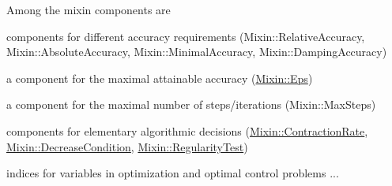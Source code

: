 Among the mixin components are
\begin{DoxyItemize}
\item components for different accuracy requirements (Mixin\+::\+Relative\+Accuracy, Mixin\+::\+Absolute\+Accuracy, Mixin\+::\+Minimal\+Accuracy, Mixin\+::\+Damping\+Accuracy)
\item a component for the maximal attainable accuracy (\hyperlink{classSpacy_1_1Mixin_1_1Eps}{Mixin\+::\+Eps})
\item a component for the maximal number of steps/iterations (Mixin\+::\+Max\+Steps)
\item components for elementary algorithmic decisions (\hyperlink{classSpacy_1_1Mixin_1_1ContractionRate}{Mixin\+::\+Contraction\+Rate}, \hyperlink{classSpacy_1_1Mixin_1_1DecreaseCondition}{Mixin\+::\+Decrease\+Condition}, \hyperlink{classSpacy_1_1Mixin_1_1RegularityTest}{Mixin\+::\+Regularity\+Test})
\item indices for variables in optimization and optimal control problems ... 
\end{DoxyItemize}